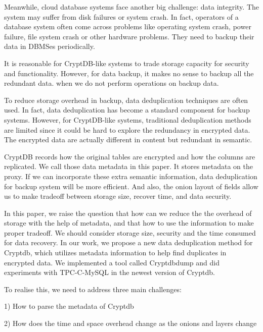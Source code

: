 Meanwhile, cloud database systems face another big challenge: data integrity. The system may suffer from disk failures or system crash. In fact, operators of a database system often come across problems like operating system crash, power failure, file system crash or other hardware problems\citep{mysqlbackupdocumentation}. They need to backup their data in DBMSes periodically.


It is reasonable for CryptDB-like systems to trade storage capacity for security and functionality. However, for data backup, it makes no sense to backup all the redundant data. when we do not perform operations on backup data.

To reduce storage overhead in backup, data deduplication techniques are often used. In fact, data deduplication has become a standard component for backup systems\citep{fu2015design}. However, for CryptDB-like systems, traditional deduplication methods are limited since it could be hard to explore the redundancy in encrypted data. The encrypted data are actually different in content but redundant in semantic. 

CryptDB records how the original tables are encrypted and how the columns are replicated. We call those data metadata in this paper. It stores metadata on the proxy. If we can incorporate these extra semantic information, data deduplication for backup system will be more efficient. And also, the onion layout of fields allow us to make tradeoff between storage size, recover time, and data security.


In this paper, we raise the question that how can we reduce the the overhead of storage with the help of metadata, and that how to use the information to make proper tradeoff. We should consider storage size, security and the time consumed for data recovery. In our work, we propose a new data deduplication method for Cryptdb, which utilizes metadata information to help find duplicates in encrypted data. We implemented a tool called Cryptdbdump and did experiments with TPC-C-MySQL in the newest version of Cryptdb.


To realise this, we need to address three main challenges:

1) How to parse the metadata of Cryptdb

2) How  does the time and space overhead change as the onions and layers change


